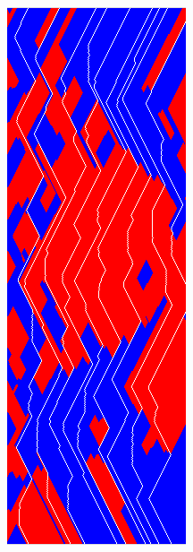 \documentclass[9pt]{beamer}
\begin{document}
\begin{frame}
  \begin{figure}
    \begin{minipage}{0.3\textwidth}
      \centering
      \includegraphics[width=0.75\linewidth]{img/dmdar-iter-gpu2.png}

\end{minipage}
\end{figure}
\end{frame}
\end{document}
